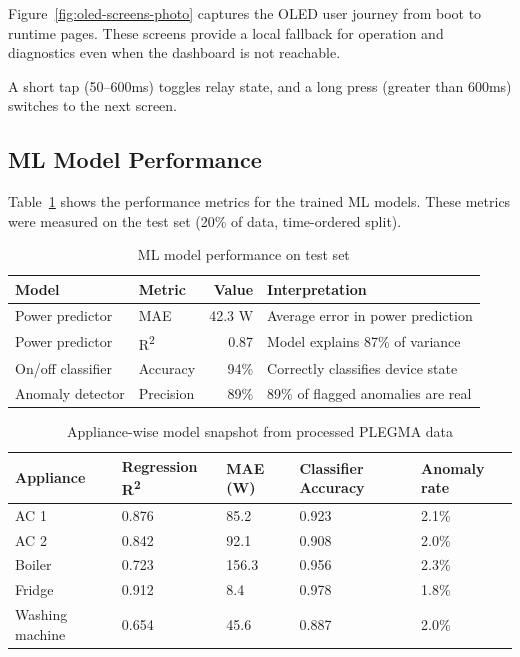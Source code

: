 \documentclass[12pt, a4paper]{article}
\numberwithin{figure}{section}
\numberwithin{table}{section}
\begin{document}
	Figure~\ref{fig:oled-screens-photo} captures the OLED user journey from boot to runtime pages. These screens provide a local fallback for operation and diagnostics even when the dashboard is not reachable.
	
	A short tap (50--600ms) toggles relay state, and a long press (greater than 600ms) switches to the next screen.
	
	\subsection{ML Model Performance}
	
	Table~\ref{tab:ml} shows the performance metrics for the trained ML models. These metrics were measured on the test set (20\% of data, time-ordered split).
	
	\begin{table}[H]
		\centering
		\caption{ML model performance on test set}
		\label{tab:ml}
		\vspace{6pt}
		\begin{tabular}{|l|l|r|p{5cm}|}
			\hline
			\textbf{Model} & \textbf{Metric} & \textbf{Value} & \textbf{Interpretation} \\
			\hline
			Power predictor & MAE & 42.3 W & Average error in power prediction \\
			\hline
			Power predictor & R\textsuperscript{2} & 0.87 & Model explains 87\% of variance \\
			\hline
			On/off classifier & Accuracy & 94\% & Correctly classifies device state \\
			\hline
			Anomaly detector & Precision & 89\% & 89\% of flagged anomalies are real \\
			\hline
		\end{tabular}
	\end{table}
	
	\begin{table}[H]
		\centering
		\caption{Appliance-wise model snapshot from processed PLEGMA data}
		\label{tab:appliance-ml}
		\vspace{6pt}
		\small
		\setlength{\tabcolsep}{4pt}
		\begin{tabularx}{\textwidth}{|p{2.1cm}|p{1.9cm}|p{1.6cm}|p{2.2cm}|X|}
			\hline
			\textbf{Appliance} & \textbf{Regression R\textsuperscript{2}} & \textbf{MAE (W)} & \textbf{Classifier Accuracy} & \textbf{Anomaly rate} \\
			\hline
			AC 1 & 0.876 & 85.2 & 0.923 & 2.1\% \\
			\hline
			AC 2 & 0.842 & 92.1 & 0.908 & 2.0\% \\
			\hline
			Boiler & 0.723 & 156.3 & 0.956 & 2.3\% \\
			\hline
			Fridge & 0.912 & 8.4 & 0.978 & 1.8\% \\
			\hline
			Washing machine & 0.654 & 45.6 & 0.887 & 2.0\% \\
			\hline
		\end{tabularx}
		\setlength{\tabcolsep}{6pt}
		\normalsize
	\end{table}
	
\end{document}
